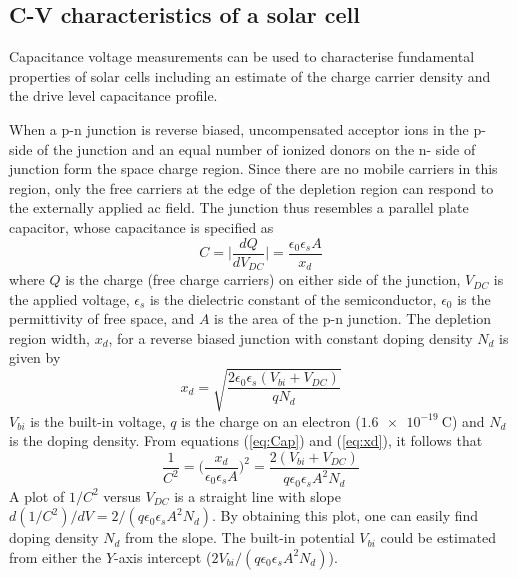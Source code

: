 \documentclass[%
 aip,
 amsmath,amssymb,
 reprint, floatfix%
]{revtex4-2}
\begin{document}
    \subsection{C-V characteristics of a solar cell}
        Capacitance voltage measurements can be used to characterise fundamental properties of solar cells including an estimate of the charge carrier density and the drive level capacitance profile.
        \par
        When a p-n junction is reverse biased, uncompensated acceptor ions in the p- side of the junction and an equal number of ionized donors on the n- side of junction form the space charge region. Since there are no mobile carriers in this region, only the free carriers at the edge of the depletion region can respond to the externally applied ac field. The junction thus resembles a parallel plate capacitor, whose capacitance is specified as
        \begin{equation}
        \label{eq:Cap}
            C = \Bigg| \dfrac{dQ}{dV_{DC}} \Bigg| = \dfrac{\epsilon_0 \epsilon_s A}{x_d}
        \end{equation}
        where $Q$ is the charge (free charge carriers) on either side of the junction, $V_{DC}$ is the applied voltage, $\epsilon_s$ is the dielectric constant of the semiconductor, $\epsilon_0$ is the permittivity of free space, and $A$ is the area of the p-n junction. The depletion region width, $x_d$, for a reverse biased junction with constant doping density $N_d$ is given by
        \begin{equation}
        \label{eq:xd}
            x_d = \sqrt{\dfrac{2 \epsilon_0 \epsilon_s (V_{bi} + V_{DC})}{q N_d}}
        \end{equation}
        $V_{bi}$ is the built-in voltage, $q$ is the charge on an electron ($\SI{1.6e-19}{\coulomb}$) and $N_d$ is the doping density. From equations (\ref{eq:Cap}) and (\ref{eq:xd}), it follows that
        \begin{equation}
            \dfrac{1}{C^2} = \Big( \dfrac{x_d}{\epsilon_0 \epsilon_s A} \Big)^2 = \dfrac{2 (V_{bi} + V_{DC})}{q \epsilon_0 \epsilon_s A^2 N_d}
        \end{equation}
        A plot of $1/C^2$ versus $V_{DC}$ is a straight line with slope $d(1/C^2)/dV = 2/(q \epsilon_0 \epsilon_s A^2 N_d)$. By obtaining this plot, one can easily find doping density $N_d$ from the slope. The built-in potential $V_{bi}$ could be estimated from either the $Y$-axis intercept ($2 V_{bi}/(q \epsilon_0 \epsilon_s A^2 N_d)$).
\end{document}
